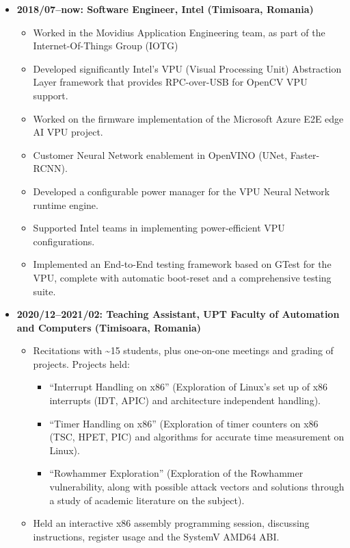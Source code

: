 \documentclass{article}
\newenvironment{tightitemize}
{\begin{itemize}
  \setlength{\itemsep}{1pt}
  \setlength{\parskip}{0pt}
  \setlength{\parsep}{0pt}}
{\end{itemize}}
\begin{document}
\begin{tightitemize}

\item \textbf{2018/07--now: Software Engineer, Intel (Timisoara, Romania)}
\begin{tightitemize}
    \item Worked in the Movidius Application Engineering team, as part of the
        Internet-Of-Things Group (IOTG)
    \item Developed significantly Intel's VPU (Visual Processing Unit) Abstraction Layer
        framework that provides RPC-over-USB for OpenCV VPU support.
    \item Worked on the firmware implementation of the Microsoft Azure E2E edge AI
        VPU project.
    \item Customer Neural Network enablement in OpenVINO (UNet, Faster-RCNN).
    \item Developed a configurable power manager for the VPU Neural Network runtime
        engine.
    \item Supported Intel teams in implementing power-efficient VPU configurations.
    \item Implemented an End-to-End testing framework based on GTest for the
        VPU, complete with automatic boot-reset and a comprehensive testing
        suite.
\end{tightitemize}

\bigskip

\item \textbf{2020/12--2021/02: Teaching Assistant, UPT Faculty of Automation
    and Computers (Timisoara, Romania)}
\begin{tightitemize}
\item Recitations with \textasciitilde15 students, plus one-on-one meetings and
    grading of projects. Projects held:
\begin{tightitemize}
    \item ``Interrupt Handling on x86'' (Exploration of Linux's set up of x86
        interrupts (IDT, APIC) and architecture independent handling).
    \item ``Timer Handling on x86'' (Exploration of timer counters on x86 (TSC,
        HPET, PIC) and algorithms for accurate time measurement on Linux).
    \item ``Rowhammer Exploration'' (Exploration of the Rowhammer vulnerability,
        along with possible attack vectors and solutions through a study of
            academic literature on the subject).
\end{tightitemize}
\item Held an interactive x86 assembly programming session, discussing
    instructions, register usage and the SystemV AMD64 ABI.
\end{tightitemize}


\end{tightitemize}
\end{document}
